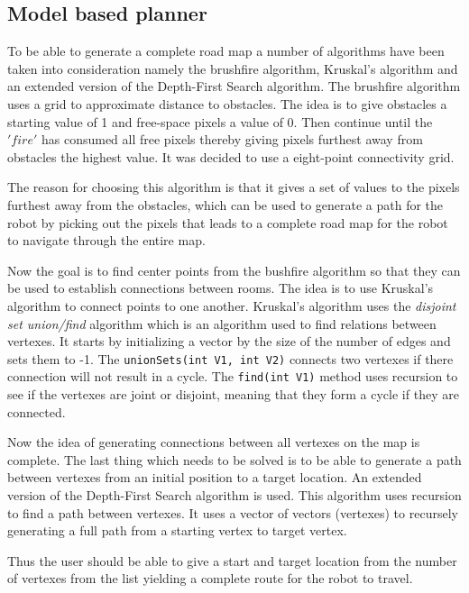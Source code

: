 \documentclass[../Head/Main.tex]{subfiles}
\begin{document}
\subsection{Model based planner}
To be able to generate a complete road map a number of algorithms have been taken into consideration namely the brushfire algorithm, Kruskal's algorithm and an extended version of the Depth-First Search algorithm. 
The brushfire algorithm uses a grid to approximate distance to obstacles. The idea is to give obstacles a starting value of 1 and free-space pixels a value of 0. Then continue until the $'fire'$ has consumed all free pixels thereby giving pixels furthest away from obstacles the highest value. It was decided to use a eight-point connectivity grid. \par


The reason for choosing this algorithm is that it gives a set of values to the pixels furthest away from the obstacles, which can be used to generate a path for the robot by picking out the pixels that leads to a complete road map for the robot to navigate through the entire map. 

Now the goal is to find center points from the bushfire algorithm so that they can be used to establish connections between rooms. The idea is to use Kruskal's algorithm to connect points to one another.  Kruskal's algorithm uses the \textit{disjoint set union/find} algorithm which is an algorithm used to find relations between vertexes. It starts by initializing a vector by the size of the number of edges and sets them to -1. The \texttt{unionSets(int V1, int V2)} connects two vertexes if there connection will not result in a cycle.  The \texttt{find(int V1)} method uses recursion to see if the vertexes are joint or disjoint, meaning that they form a cycle if they are connected.     


Now the idea of generating connections between all vertexes on the map is complete. The last thing which needs to be solved is to be able to generate a path between vertexes from an initial position to a target location. An extended version of the Depth-First Search algorithm is used. This algorithm uses recursion to find a path between vertexes. It uses a vector of vectors (vertexes) to recursely generating a full path from a starting vertex to target vertex. 

Thus the user should be able to give a start and target location from the number of vertexes from the list yielding a complete route for the robot to travel.
\end{document}
